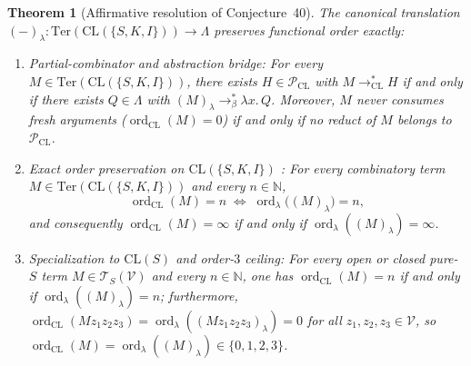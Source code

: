 \documentclass[11pt,reqno]{amsart}
\numberwithin{equation}{section}
\theoremstyle{plain}
\newtheorem{theorem}{Theorem}[section]
\theoremstyle{definition}
\theoremstyle{remark}
\DeclareMathOperator{\ord}{ord}
\newcommand{\CLS}{\mathrm{CL}(S)}
\newcommand{\TSV}{\mathcal{T}_S(\mathcal{V})}
\begin{document}
\begin{theorem}[Affirmative resolution of Conjecture~40]\label{thm:conjecture-40}
The canonical translation $(-)_\lambda \colon \mathrm{Ter}(\mathrm{CL}(\{S, K, I\})) \to \Lambda$ preserves functional order exactly:
\begin{enumerate}[label=(\roman*),leftmargin=2.2em]
  \item \emph{Partial-combinator and abstraction bridge:} For every $M \in \mathrm{Ter}(\mathrm{CL}(\{S, K, I\}))$, there exists $H \in \mathcal{P}_{\mathrm{CL}}$ with $M \to_{\mathrm{CL}}^* H$ if and only if there exists $Q \in \Lambda$ with $(M)_\lambda \to_\beta^* \lambda x.\, Q$. Moreover, $M$ never consumes fresh arguments ($\ord_{\mathrm{CL}}(M) = 0$) if and only if no reduct of $M$ belongs to $\mathcal{P}_{\mathrm{CL}}$.
  \item \emph{Exact order preservation on $\mathrm{CL}(\{S, K, I\})$ \cite[Conjecture~40, p.~102]{BarendregtEndrullisKlopWaldmann2017}:} For every combinatory term $M \in \mathrm{Ter}(\mathrm{CL}(\{S, K, I\}))$ and every $n \in \mathbb{N}$,
  \[
    \ord_{\mathrm{CL}}(M) = n \;\iff\; \ord_\lambda\bigl((M)_\lambda\bigr) = n,
  \]
  and consequently $\ord_{\mathrm{CL}}(M) = \infty$ if and only if $\ord_\lambda((M)_\lambda) = \infty$.
  \item \emph{Specialization to $\CLS$ and order-$3$ ceiling:} For every open or closed pure-$S$ term $M \in \TSV$ and every $n \in \mathbb{N}$, one has $\ord_{\mathrm{CL}}(M) = n$ if and only if $\ord_\lambda((M)_\lambda) = n$; furthermore, $\ord_{\mathrm{CL}}(M z_1 z_2 z_3) = \ord_\lambda((M z_1 z_2 z_3)_\lambda) = 0$ for all $z_1, z_2, z_3 \in \mathcal{V}$, so $\ord_{\mathrm{CL}}(M) = \ord_\lambda((M)_\lambda) \in \{0, 1, 2, 3\}$.
\end{enumerate}
\end{theorem}
\end{document}
